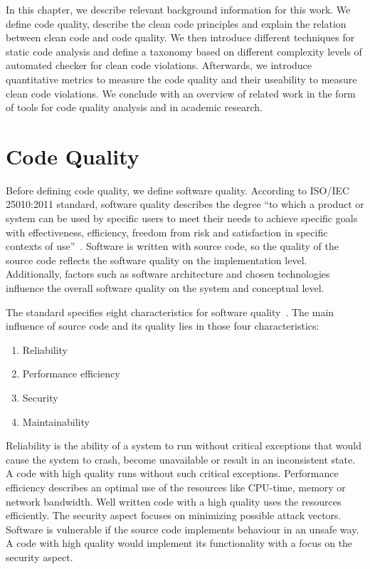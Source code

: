 In this chapter, we describe relevant background information for this work. We define code quality, describe the clean code principles and explain the relation between clean code and code quality. We then introduce different techniques for static code analysis and define a taxonomy based on different complexity levels of automated checker for clean code violations. Afterwards, we introduce quantitative metrics to measure the code quality and their useability to measure clean code violations. We conclude with an overview of related work in the form of tools for code quality analysis and in academic research.

\section{Code Quality}\label{sec:code_quality}
Before defining code quality, we define software quality. According to ISO/IEC 25010:2011 standard, software quality describes the degree \enquote{to which a product or system can be used by specific users to meet their needs to achieve specific goals with effectiveness, efficiency, freedom from risk and satisfaction in specific contexts of use}~\cite{iso_central_secretary_isoiec_2011-1}. Software is written with source code, so the quality of the source code reflects the software quality on the implementation level. Additionally, factors such as software architecture and chosen technologies influence the overall software quality on the system and conceptual level.

The standard specifies eight characteristics for software quality~\cite{iso_central_secretary_isoiec_2011-1}. The main influence of source code and its quality lies in those four characteristics:
\begin{enumerate}
    \item Reliability
    \item Performance efficiency
    \item Security
    \item Maintainability
\end{enumerate}
Reliability is the ability of a system to run without critical exceptions that would cause the system to crash, become unavailable or result in an inconsistent state. A code with high quality runs without such critical exceptions. Performance efficiency describes an optimal use of the resources like CPU-time, memory or network bandwidth. Well written code with a high quality uses the resources efficiently. The security aspect focuses on minimizing possible attack vectors. Software is vulnerable if the source code implements behaviour in an unsafe way. A code with high quality would implement its functionality with a focus on the security aspect. 


